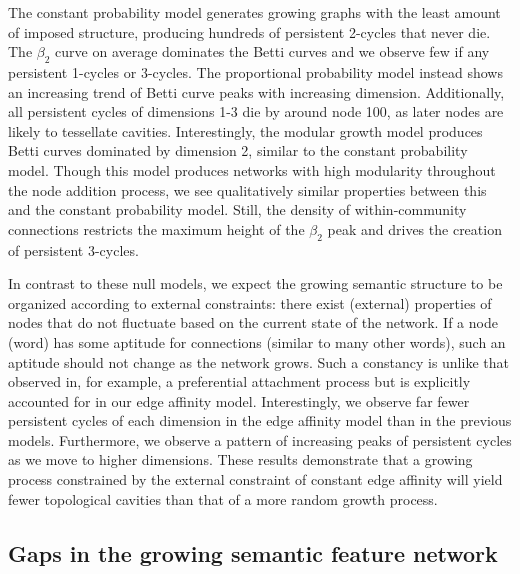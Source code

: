 \documentclass{article}
\begin{document}
The constant probability model generates growing graphs with the least amount of imposed structure, producing hundreds of persistent 2-cycles that never die. The $\beta_2$ curve on average dominates the Betti curves and we observe few if any persistent 1-cycles or 3-cycles. The proportional probability model instead shows an increasing trend of Betti curve peaks with increasing dimension. Additionally, all persistent cycles of dimensions 1-3 die by around node 100, as later nodes are likely to tessellate cavities. Interestingly, the modular growth model produces Betti curves dominated by dimension 2, similar to the constant probability model. Though this model produces networks with high modularity throughout the node addition process, we see qualitatively similar properties between this and the constant probability model. Still, the density of within-community connections restricts the maximum height of the $\beta_2$ peak and drives the creation of persistent 3-cycles.

In contrast to these null models, we expect the growing semantic structure to be organized according to external constraints: there exist (external) properties of nodes that do not fluctuate based on the current state of the network. If a node (word) has some aptitude for connections (similar to many other words), such an aptitude should not change as the network grows. Such a constancy is unlike that observed in, for example, a preferential attachment process but is explicitly accounted for in our edge affinity model. Interestingly, we observe far fewer persistent cycles of each dimension in the edge affinity model than in the previous models. Furthermore, we observe a pattern of increasing peaks of persistent cycles as we move to higher dimensions. These results demonstrate that a growing process constrained by the external constraint of constant edge affinity will yield fewer topological cavities than that of a more random growth process.


\subsection*{Gaps in the growing semantic feature network}
\end{document}
